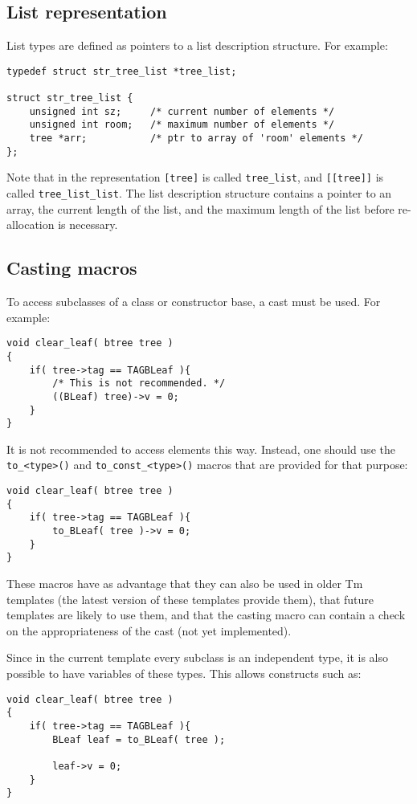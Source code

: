 \subsection{List representation}
List types are defined as pointers to a list description structure.
For example:
\begin{showfile}
\begin{verbatim}
typedef struct str_tree_list *tree_list;

struct str_tree_list {
    unsigned int sz;     /* current number of elements */
    unsigned int room;   /* maximum number of elements */
    tree *arr;           /* ptr to array of 'room' elements */
};
\end{verbatim}
\end{showfile}
\begin{sloppypar}
Note that in the {\C} representation \verb+[tree]+ is called
\verb+tree_list+, and \verb+[[tree]]+ is called \verb+tree_list_list+.
The list description structure contains a pointer to an array, the
current length of the list, and the maximum length of the list before
re-allocation is necessary.
\end{sloppypar}
\subsection{Casting macros}
To access subclasses of a class or constructor base, a cast must be used.
For example:
\begin{showfile}
\begin{verbatim}
void clear_leaf( btree tree )
{
    if( tree->tag == TAGBLeaf ){
        /* This is not recommended. */
        ((BLeaf) tree)->v = 0;
    }
}
\end{verbatim}
\end{showfile}
It is not recommended to access elements this way. Instead, one should
use the \verb'to_<type>()' and \verb'to_const_<type>()' macros that are provided for that purpose:
\begin{showfile}
\begin{verbatim}
void clear_leaf( btree tree )
{
    if( tree->tag == TAGBLeaf ){
        to_BLeaf( tree )->v = 0;
    }
}
\end{verbatim}
\end{showfile}
These macros have as advantage that they can also be used in older
Tm templates (the latest version of these templates provide them),
that future templates are likely to use them, and that the casting
macro can contain a check on the appropriateness of the cast
(not yet implemented).
\par
Since in the current template every subclass is an independent type,
it is also possible to have variables of these types. This allows
constructs such as:
\begin{showfile}
\begin{verbatim}
void clear_leaf( btree tree )
{
    if( tree->tag == TAGBLeaf ){
        BLeaf leaf = to_BLeaf( tree );

        leaf->v = 0;
    }
}
\end{verbatim}
\end{showfile}

